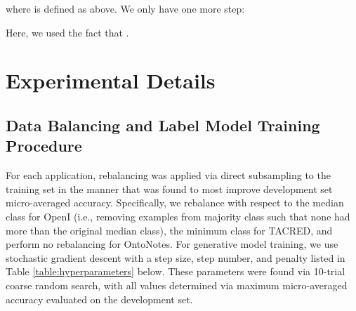 \documentclass[letterpaper]{article}
\begin{document}
\begin{appendix}
where  is defined as above.
We only have one more step:

Here, we used the fact that . \hfill 
 
\section{Experimental Details}
  \label{appendix:exp_details}
  

\subsection{Data Balancing and Label Model Training Procedure}
For each application, rebalancing was applied via direct subsampling to the training set in the manner that was found to most improve development set micro-averaged accuracy.  Specifically, we rebalance with respect to the median class for OpenI (i.e., removing examples from majority class such that none had more than the original median class), the minimum class for TACRED, and perform no rebalancing for OntoNotes.  For generative model training, we use stochastic gradient descent with a step size, step number, and  penalty listed in Table \ref{table:hyperparameters} below.  These parameters were found via 10-trial coarse random search, with all values determined via maximum micro-averaged accuracy evaluated on the development set. 


\end{appendix}
\end{document}
